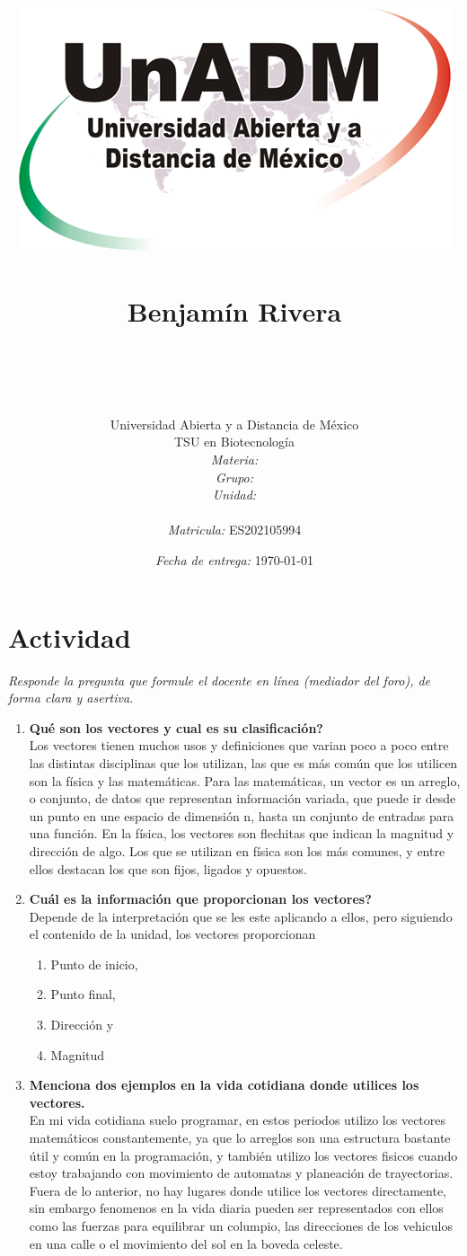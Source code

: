 \documentclass[12pt]{article}
\title{
	\includegraphics{../../../assets/logo-unadm} \\
	\ \\ Benjam\'in Rivera \\
	\bf{\titulo}\\\ \\}
\author{
	Universidad Abierta y a Distancia de México \\
	TSU en Biotecnolog\'ia \\
	\textit{Materia:} \materia \\
	\textit{Grupo:} \grupo \\
	\textit{Unidad:} \unidad \\
	\\
	\textit{Matricula:} ES202105994 }
\date{\textit{Fecha de entrega:} \today}
\begin{document}
\maketitle\newpage

\section{Actividad}
	
	\par \textit{Responde la pregunta que formule el docente en línea (mediador del foro), de forma clara y asertiva.}
	\begin{enumerate}
		\item \textbf{Qu\'e son los vectores y cual es su clasificación?} \\ Los vectores tienen muchos usos y definiciones que varian poco a poco entre las distintas disciplinas que los utilizan, las que es más común que los utilicen son la física y las matemáticas. Para las matemáticas, un vector es un arreglo, o conjunto, de datos que representan información variada, que puede ir desde un punto en une espacio de dimensión n, hasta un conjunto de entradas para una función. En la física, los vectores son flechitas que indican la magnitud y dirección de algo. Los que se utilizan en física son los más comunes, y entre ellos destacan los que son fijos, ligados y opuestos.
		
		\item \textbf{Cuál es la información que proporcionan los vectores?} \\ Depende de la interpretación que se les este aplicando a ellos, pero siguiendo el contenido de la unidad, los vectores proporcionan
			\begin{enumerate}
				\item Punto de inicio,
				\item Punto final,
				\item Direcci\'on y
				\item Magnitud
			\end{enumerate}
		
		\item \textbf{Menciona dos ejemplos en la vida cotidiana donde utilices los vectores.} \\ En mi vida cotidiana suelo programar, en estos periodos utilizo los vectores matemáticos constantemente, ya que lo arreglos son una estructura bastante útil y común en la programación, y también utilizo los vectores fisicos cuando estoy trabajando con movimiento de automatas y planeación de trayectorias. Fuera de lo anterior, no hay lugares donde utilice los vectores directamente, sin embargo fenomenos en la vida diaria pueden ser representados con ellos como las fuerzas para equilibrar un columpio, las direcciones de los vehiculos en una calle o el movimiento del sol en la boveda celeste.
		

\end{enumerate}
\end{document}
